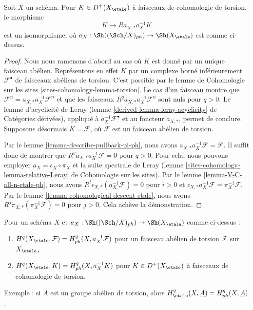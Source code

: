 \begin{lemma}
\label{lemma-cohomological-descent-etale-ph}
Soit $X$ un schéma. Pour $K \in D^+(X_\etale)$ à faisceaux de cohomologie
de torsion, le morphisme
$$
K \longrightarrow Ra_{X, *}a_X^{-1}K
$$
est un isomorphisme, où $a_X : \Sh((\Sch/X)_{ph}) \to \Sh(X_\etale)$ est comme ci-dessus.
\end{lemma}

\begin{proof}
Nous nous ramenons d'abord au cas où
$K$ est donné par un unique faisceau abélien. Représentons en effet $K$
par un complexe borné inférieurement $\mathcal{F}^\bullet$ de faisceaux
abéliens de torsion. C'est possible par le lemme de Cohomologie sur les sites
\ref{sites-cohomology-lemma-torsion}. Le cas d'un
faisceau montre que
$\mathcal{F}^n = a_{X, *} a_X^{-1} \mathcal{F}^n$
et que les faisceaux $R^qa_{X, *}a_X^{-1}\mathcal{F}^n$
sont nuls pour $q > 0$. Le lemme d'acyclicité de Leray
(lemme \ref{derived-lemma-leray-acyclicity} de Catégories dérivées),
appliqué à $a_X^{-1}\mathcal{F}^\bullet$
et au foncteur $a_{X, *}$, permet de conclure. Supposons désormais $K = \mathcal{F}$,
où $\mathcal{F}$ est un faisceau abélien de torsion.

\medskip\noindent
Par le lemme \ref{lemma-describe-pullback-pi-ph}, nous avons
$a_{X, *}a_X^{-1}\mathcal{F} = \mathcal{F}$. Il suffit donc de montrer que
$R^qa_{X, *}a_X^{-1}\mathcal{F} = 0$ pour $q > 0$.
Pour cela, nous pouvons employer $a_X = \epsilon_X \circ \pi_X$ et
la suite spectrale de Leray
(lemme \ref{sites-cohomology-lemma-relative-Leray} de Cohomologie sur les sites).
Par le lemme \ref{lemma-V-C-all-n-etale-ph},
nous avons $R^i\epsilon_{X, *}(a_X^{-1}\mathcal{F}) = 0$ pour $i > 0$
et $\epsilon_{X, *}a_X^{-1}\mathcal{F} = \pi_X^{-1}\mathcal{F}$.
Par le lemme \ref{lemma-cohomological-descent-etale}, nous avons
$R^j\pi_{X, *}(\pi_X^{-1}\mathcal{F}) = 0$ pour $j > 0$.
Cela achève la démonstration.
\end{proof}

\begin{lemma}
\label{lemma-compare-cohomology-etale-ph}
Pour un schéma $X$ et $a_X : \Sh((\Sch/X)_{ph}) \to \Sh(X_\etale)$
comme ci-dessus :
\begin{enumerate}
\item $H^q(X_\etale, \mathcal{F}) = H^q_{ph}(X, a_X^{-1}\mathcal{F})$
pour un faisceau abélien de torsion $\mathcal{F}$ sur $X_\etale$,
\item $H^q(X_\etale, K) = H^q_{ph}(X, a_X^{-1}K)$
pour $K \in D^+(X_\etale)$ à faisceaux de cohomologie de torsion.
\end{enumerate}
Exemple : si $A$ est un groupe abélien de torsion, alors
$H^q_\etale(X, \underline{A}) = H^q_{ph}(X, \underline{A})$.
\end{lemma}

